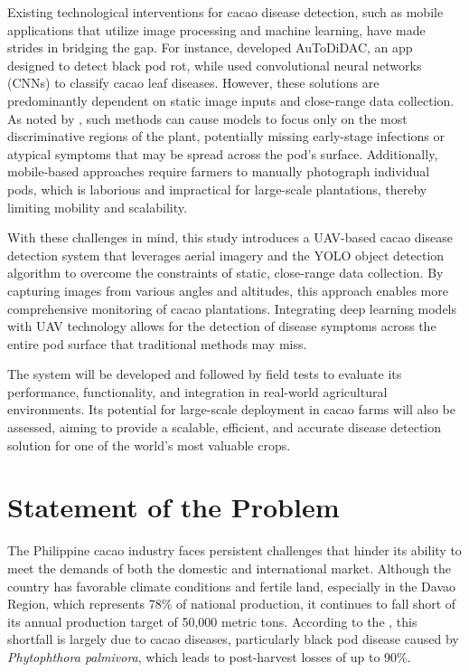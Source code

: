 {Existing technological interventions for cacao disease detection, such as mobile applications that utilize image processing and machine learning, have made strides in bridging the gap. For instance, \cite{Tan2018} developed AuToDiDAC, an app designed to detect black pod rot, while \cite{Tovurawa2025} used convolutional neural networks (CNNs) to classify cacao leaf diseases. However, these solutions are predominantly dependent on static image inputs and close-range data collection. As noted by \cite{Taesiri2023}, such methods can cause models to focus only on the most discriminative regions of the plant, potentially missing early-stage infections or atypical symptoms that may be spread across the pod’s surface. Additionally, mobile-based approaches require farmers to manually photograph individual pods, which is laborious and impractical for large-scale plantations, thereby limiting mobility and scalability.

With these challenges in mind, this study introduces a UAV-based cacao disease detection system that leverages aerial imagery and the YOLO object detection algorithm to overcome the constraints of static, close-range data collection. By capturing images from various angles and altitudes, this approach enables more comprehensive monitoring of cacao plantations. Integrating deep learning models with UAV technology allows for the detection of disease symptoms across the entire pod surface that traditional methods may miss.

The system will be developed and followed by field tests to evaluate its performance, functionality, and integration in real-world agricultural environments. Its potential for large-scale deployment in cacao farms will also be assessed, aiming to provide a scalable, efficient, and accurate disease detection solution for one of the world’s most valuable crops.

\section{Statement of the Problem}

The Philippine cacao industry faces persistent challenges that hinder its ability to meet the demands of both the domestic and international market. Although the country has favorable climate conditions and fertile land, especially in the Davao Region, which represents 78\% of national production, it continues to fall short of its annual production target of 50,000 metric tons. According to the \cite{PhilCacaoRoadmap2021}, this shortfall is largely due to cacao diseases, particularly black pod disease caused by \textit{Phytophthora palmivora}, which leads to post-harvest losses of up to 90\%.

}
